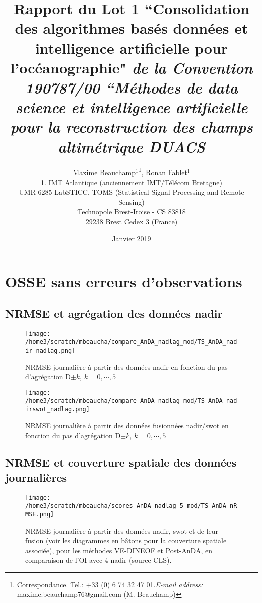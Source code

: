 \documentclass[fleqn]{report}
\title{Rapport du Lot 1 ``Consolidation des algorithmes basés données et intelligence artificielle pour l'océanographie" \newline \smaller{} \textit{de la Convention 190787/00 ``Méthodes de data science et intelligence artificielle pour la reconstruction des champs altimétrique DUACS}}
\author{Maxime Beauchamp$^{1}$\footnote{Correspondance. Tel.: +33 (0) 6 74 32 47 01.\newline\textit{E-mail address:} maxime.beauchamp76@gmail.com (M. Beauchamp)}, Ronan Fablet$^{1}$ \\ 
{\small 1. IMT Atlantique (anciennement IMT/Télécom Bretagne)} \\  	
{\small UMR 6285 LabSTICC, TOMS (Statistical Signal Processing and Remote Sensing)} \\
{\small Technopole Brest-Iroise - CS 83818} \\
{\small 29238 Brest Cedex 3 (France)} }
\date{Janvier 2019}
\begin{document}
{
\makeatletter
\addtocounter{footnote}{1} %
\renewcommand\thefootnote{\@fnsymbol\c@footnote}%
\makeatother
\maketitle
}

\maketitle

\begin{small}
\tableofcontents
\end{small}


\section{OSSE sans erreurs d'observations}

\subsection{NRMSE et agrégation des données nadir}

\begin{figure}[H]
  \centering
  \texttt{[image: /home3/scratch/mbeaucha/compare\_AnDA\_nadlag\_mod/TS\_AnDA\_nadir\_nadlag.png]}
  \caption{NRMSE journalière à partir des données nadir en fonction du pas d'agrégation D$\pm k$, $k=0,\cdots,5$}
\end{figure} 

\begin{figure}[H]
  \centering
  \texttt{[image: /home3/scratch/mbeaucha/compare\_AnDA\_nadlag\_mod/TS\_AnDA\_nadirswot\_nadlag.png]}
  \caption{NRMSE journalière à partir des données fusionnées nadir/swot en fonction du pas d'agrégation D$\pm k$, $k=0,\cdots,5$}
\end{figure} 

\subsection{NRMSE et couverture spatiale des données journalières}

\begin{figure}[H]
  \centering
  \texttt{[image: /home3/scratch/mbeaucha/scores\_AnDA\_nadlag\_5\_mod/TS\_AnDA\_nRMSE.png]}
  \caption{NRMSE journalière à partir des données nadir, swot et de leur fusion (voir les diagrammes en bâtons pour la couverture spatiale associée), pour les méthodes VE-DINEOF et Post-AnDA, en comparaison de l'OI avec 4 nadir (source CLS).}
\end{figure} 
\end{document}
